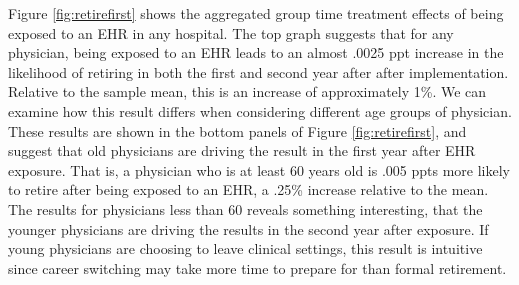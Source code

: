 \documentclass[11pt]{article}
\begin{document}
Figure \ref{fig:retirefirst} shows the aggregated group time treatment effects of being exposed to an EHR in any hospital. The top graph suggests that for any physician, being exposed to an EHR leads to an almost .0025 ppt increase in the likelihood of retiring in both the first and second year after after implementation. Relative to the sample mean, this is an increase of approximately 1\%. We can examine how this result differs when considering different age groups of physician. These results are shown in the bottom panels of Figure \ref{fig:retirefirst}, and suggest that old physicians are driving the result in the first year after EHR exposure. That is, a physician who is at least 60 years old is .005 ppts more likely to retire after being exposed to an EHR, a .25\% increase relative to the mean. The results for physicians less than 60 reveals something interesting, that the younger physicians are driving the results in the second year after exposure. If young physicians are choosing to leave clinical settings, this result is intuitive since career switching may take more time to prepare for than formal retirement.    
\end{document}
